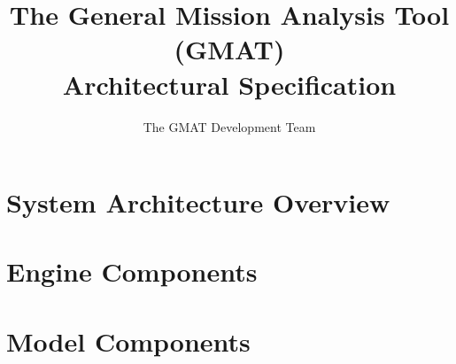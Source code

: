 \documentclass[letterpaper,10pt]{book}
\title{The General Mission Analysis Tool (GMAT)\\Architectural Specification}
\author{The GMAT Development Team}
\begin{document}
\newcommand\chapauthor[2]{\begin{flushleft}\emph{#1}\\\emph{#2}\end{flushleft}}


\thispagestyle{empty}

\frontmatter

\tableofcontents
\clearpage
\listoffigures
\clearpage
\listoftables



\mainmatter

\part{System Architecture Overview}
\clearpage
\clearpage
\thispagestyle{empty}







\part{Engine Components}
\thispagestyle{empty}









%





\part{Model Components}
\thispagestyle{empty}




%

\end{document}
